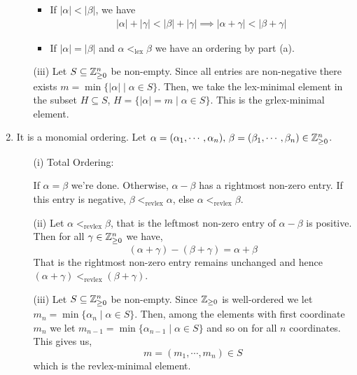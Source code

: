 \documentclass[Notebook.tex]{subfiles}
\begin{document}
\begin{solution}
\begin{enumerate}[label=(\alph*),ref=\theenumi\alph*]
\begin{enumerate}
            \begin{itemize}
                \item If $|\alpha |  < |\beta|$, we have
                \begin{align*}
                  |\alpha| + |\gamma|  < |\beta| + |\gamma| \implies   |\alpha +\gamma |  < |\beta +\gamma| 
                \end{align*}
                
                \item If $|\alpha | = |\beta|$ and $\alpha <_\text{lex} \beta$ we have an ordering by part (a). 
            \end{itemize}
            
            \item [(iii)] Let $S \subseteq \Z_{\geq 0}^n$ be non-empty. Since all entries are non-negative there exists $m = \min\{|\alpha| \mid \alpha \in S\}$. Then, we take the lex-minimal element in the subset $H \subseteq S$, $H = \{|\alpha| = m \mid \alpha \in S\}$. This is the grlex-minimal element.  
        \end{enumerate}

        \item It is a monomial ordering. 
        Let $\alpha = (\alpha_1, \cdots, \alpha_n), \, \beta = (\beta_1, \cdots, \beta_n) \in \mathbb Z_{\geq 0}^n$. 
        \begin{enumerate}
            \item [(i)] Total Ordering: 
            
            If $\alpha = \beta$ we're done. Otherwise, $\alpha - \beta$ has a rightmost non-zero entry. If this entry is negative, $\beta <_{\text{revlex}} \alpha$, else $\alpha <_{\text{revlex}} \beta$. 

            \item [(ii)] Let $\alpha <_\text{revlex} \beta$, that is the leftmost non-zero entry of $\alpha - \beta$ is positive. Then for all $\gamma \in \mathbb Z_{\geq 0}^n$ we have, 
            \[(\alpha + \gamma) - (\beta + \gamma) = \alpha + \beta\]
            That is the rightmost non-zero entry remains unchanged and hence $(\alpha + \gamma) <_\text{revlex} (\beta + \gamma)$. 

            \item [(iii)] Let $S \subseteq \Z_{\geq 0}^n$ be non-empty. Since $\mathbb Z_{\geq 0}$ is well-ordered we let $m_n = \min \{\alpha_n \mid \alpha \in S\}$. Then, among the elements with first coordinate $m_n$ we let $m_{n-1} = \min \{\alpha_{n-1} \mid \alpha \in S\}$ and so on for all $n$ coordinates. This gives us, 
            \[ m = (m_1, \cdots, m_n) \in S\]
            which is the revlex-minimal element. 
        \end{enumerate}


\end{enumerate}
\end{solution}
\end{document}

